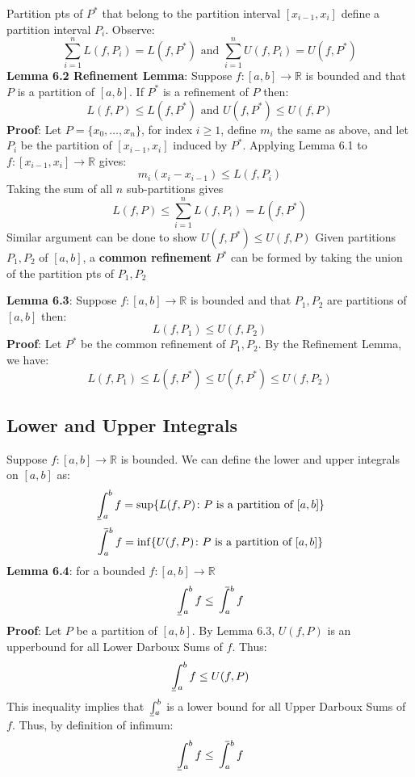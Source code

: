 \documentclass{article}
\def\upint{\mathchoice%
    {\mkern13mu\overline{\vphantom{\intop}\mkern7mu}\mkern-20mu}%
    {\mkern7mu\overline{\vphantom{\intop}\mkern7mu}\mkern-14mu}%
    {\mkern7mu\overline{\vphantom{\intop}\mkern7mu}\mkern-14mu}%
    {\mkern7mu\overline{\vphantom{\intop}\mkern7mu}\mkern-14mu}%
  \int}
\def\lowint{\mkern3mu\underline{\vphantom{\intop}\mkern7mu}\mkern-10mu\int}
\begin{document}
  Partition pts of $P^*$ that belong to the partition interval $[x_{i-1}, x_i]$ define a partition interval $P_i$. Observe:
  \[\sum_{i=1}^{n}L(f, P_i) = L(f, P^*) \text{ and } \sum_{i = 1}^{n}U(f, P_i) = U(f, P^*)\]
  \textbf{Lemma 6.2 Refinement Lemma}: Suppose $f \colon [a, b] \rightarrow \mathbb{R}$ is bounded and that $P$ is a partition of $[a, b]$. If $P^*$ is a refinement of $P$ then:
  \[L(f, P) \leq L(f, P^*) \text{ and } U(f, P^*) \leq U(f, P)\]
  \textbf{Proof}: Let $P = \{x_0, \ldots, x_n\}$, for index $i \geq 1$, define $m_i$ the same as above, and let $P_i$ be the partition of $[x_{i-1}, x_i]$ induced by $P^*$. Applying Lemma 6.1 to $f \colon [x_{i-1}, x_i] \rightarrow \mathbb{R}$ gives:
  \[m_i(x_i - x_{i-1}) \leq L(f, P_i)\]
  Taking the sum of all $n$ sub-partitions gives
  \[L(f, P) \leq \sum_{i = 1}^{n}L(f, P_i) = L(f, P^*)\]
  Similar argument can be done to show $U(f, P^*) \leq U(f,P)$ \newline \newline
  Given partitions $P_1, P_2$ of $[a,b]$, a \textbf{common refinement} $P^*$ can be formed by taking the union of the partition pts of $P_1, P_2$

  \textbf{Lemma 6.3}: Suppose $f \colon [a, b] \rightarrow \mathbb{R}$ is bounded and that $P_1, P_2$ are partitions of $[a, b]$ then:
  \[L(f, P_1) \leq U(f, P_2)\]
  \textbf{Proof}: Let $P^*$ be the common refinement of $P_1, P_2$. By the Refinement Lemma, we have:
  \[L(f, P_1) \leq L(f, P^*) \leq U(f, P^*) \leq U(f, P_2)\]
  \subsection{Lower and Upper Integrals}
  Suppose $f \colon [a, b] \rightarrow \mathbb{R}$ is bounded. We can define the lower and upper integrals on $[a,b]$ as:
  \[\lowint_{a}^{b}f = \sup\{L(f, P) \colon P \text{ is a partition of } [a,b]\}\]
  \[\upint_{a}^{b}f = \inf\{U(f, P) \colon P \text{ is a partition of } [a,b]\}\]
  \textbf{Lemma 6.4}: for a bounded $f \colon [a, b] \rightarrow \mathbb{R}$
  \[\lowint_{a}^{b}f \leq \upint_{a}^{b}f\]
  \textbf{Proof}: Let $P$ be a partition of $[a, b]$. By Lemma 6.3, $U(f, P)$ is an upperbound for all Lower Darboux Sums of $f$. Thus:
  \[\lowint_{a}^{b}f \leq U(f, P)\]
  This inequality implies that $\lowint_{a}^{b}$ is a lower bound for all Upper Darboux Sums of $f$. Thus, by definition of infimum:
  \[\lowint_{a}^{b}f \leq \upint_{a}^{b}f\]
\end{document}
